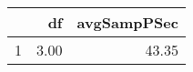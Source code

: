 \begin{table}[h]
\centering
\begin{tabular}{rrr}
  \hline
 & df & avgSampPSec \\ 
  \hline
1 & 3.00 & 43.35 \\ 
   \hline
\end{tabular}
\end{table}
